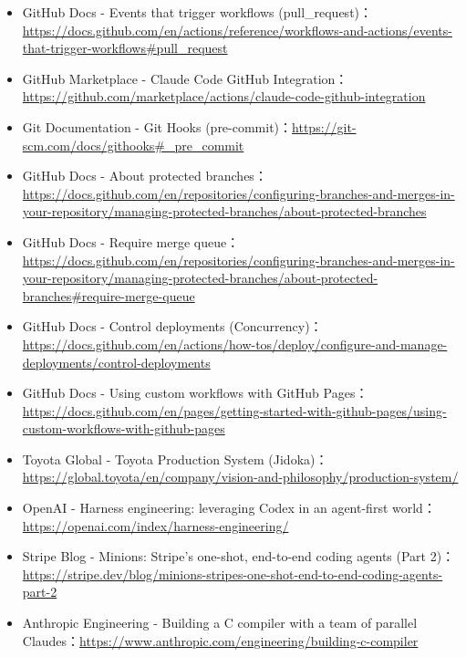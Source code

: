 \documentclass[UTF8,a4paper,11pt,fontset=fandol]{ctexart}
\begin{document}
\begin{itemize}
\item GitHub Docs - Events that trigger workflows (pull\_request)：\url{https://docs.github.com/en/actions/reference/workflows-and-actions/events-that-trigger-workflows#pull_request}

\item GitHub Marketplace - Claude Code GitHub Integration：\url{https://github.com/marketplace/actions/claude-code-github-integration}

\item Git Documentation - Git Hooks (pre-commit)：\url{https://git-scm.com/docs/githooks#_pre_commit}

\item GitHub Docs - About protected branches：\url{https://docs.github.com/en/repositories/configuring-branches-and-merges-in-your-repository/managing-protected-branches/about-protected-branches}

\item GitHub Docs - Require merge queue：\url{https://docs.github.com/en/repositories/configuring-branches-and-merges-in-your-repository/managing-protected-branches/about-protected-branches#require-merge-queue}

\item GitHub Docs - Control deployments (Concurrency)：\url{https://docs.github.com/en/actions/how-tos/deploy/configure-and-manage-deployments/control-deployments}

\item GitHub Docs - Using custom workflows with GitHub Pages：\url{https://docs.github.com/en/pages/getting-started-with-github-pages/using-custom-workflows-with-github-pages}

\item Toyota Global - Toyota Production System (Jidoka)：\url{https://global.toyota/en/company/vision-and-philosophy/production-system/}

\item OpenAI - Harness engineering: leveraging Codex in an agent-first world：\url{https://openai.com/index/harness-engineering/}

\item Stripe Blog - Minions: Stripe's one-shot, end-to-end coding agents (Part 2)：\url{https://stripe.dev/blog/minions-stripes-one-shot-end-to-end-coding-agents-part-2}

\item Anthropic Engineering - Building a C compiler with a team of parallel Claudes：\url{https://www.anthropic.com/engineering/building-c-compiler}


\end{itemize}
\end{document}
